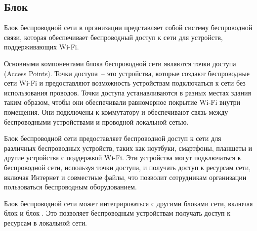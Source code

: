 \subsection{Блок \blockAccessPoint}

Блок беспроводной сети в организации представляет собой систему беспроводной связи, 
которая обеспечивает беспроводный доступ к сети для устройств, поддерживающих Wi-Fi.

Основными компонентами блока беспроводной сети являются точки доступа (Access Points). 
Точки доступа~-- это устройства, которые создают беспроводные сети Wi-Fi и предоставляют возможность устройствам подключаться к сети без использования проводов.
Точки доступа устанавливаются в разных местах здания таким образом, чтобы они обеспечивали равномерное покрытие Wi-Fi внутри помещения.
Они подключены к коммутатору и обеспечивают связь между беспроводными устройствами и проводной локальной сетью.

Блок беспроводной сети предоставляет беспроводной доступ к сети для различных беспроводных устройств, 
таких как ноутбуки, смартфоны, планшеты и другие устройства с поддержкой Wi-Fi. 
Эти устройства могут подключаться к беспроводной сети, используя точки доступа, и получать доступ к ресурсам сети, 
включая Интернет и совместные файлы, что позволит сотрудникам организации пользоваться беспроводным оборудованием.

Блок беспроводной сети может интегрироваться с другими блоками сети, включая блок \blockDevices и блок \blockVideo\@. 
Это позволяет беспроводным устройствам получать доступ к ресурсам в локальной сети.